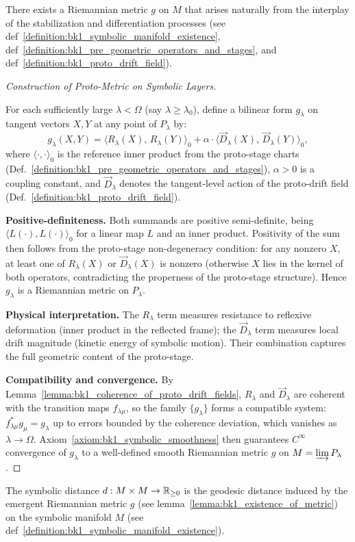 \begin{lemma}
\label{lemma:bk1_existence_of_metric}
There exists a Riemannian metric $g$ on $M$ that arises naturally from the interplay of the stabilization and differentiation processes (see def~\ref{definition:bk1_symbolic_manifold_existence}, def~\ref{definition:bk1_pre_geometric_operators_and_stages}, and def~\ref{definition:bk1_proto_drift_field}).
\begin{proof}[Construction of Proto-Metric on Symbolic Layers]
\label{proof:bk1_sketch_construction_proto_metric}
\leavevmode

For each sufficiently large $\lambda < \Omega$ (say $\lambda \ge \lambda_0$), define a
bilinear form $g_\lambda$ on tangent vectors $X, Y$ at any point of $P_\lambda$ by:
\[
g_\lambda(X, Y)
= \bigl\langle R_\lambda(X),\, R_\lambda(Y) \bigr\rangle_0
+ \alpha \cdot \bigl\langle \vec{D}_\lambda(X),\, \vec{D}_\lambda(Y) \bigr\rangle_0,
\]
where $\langle\cdot,\cdot\rangle_0$ is the reference inner product from the proto-stage
charts (Def.~\ref{definition:bk1_pre_geometric_operators_and_stages}), $\alpha > 0$ is a
coupling constant, and $\vec{D}_\lambda$ denotes the tangent-level action of the
proto-drift field (Def.~\ref{definition:bk1_proto_drift_field}).

\textbf{Positive-definiteness.}
Both summands are positive semi-definite, being
$\langle L(\cdot), L(\cdot)\rangle_0$ for a linear map $L$ and an inner product. Positivity of the sum then follows from the proto-stage
non-degeneracy condition: for any nonzero $X$, at least one of $R_\lambda(X)$ or
$\vec{D}_\lambda(X)$ is nonzero (otherwise $X$ lies in the kernel of both operators,
contradicting the properness of the proto-stage structure).
Hence $g_\lambda$ is a Riemannian metric on $P_\lambda$.

\textbf{Physical interpretation.}
The $R_\lambda$ term measures resistance to reflexive deformation (inner product in the
reflected frame); the $\vec{D}_\lambda$ term measures local drift magnitude (kinetic
energy of symbolic motion). Their combination captures the full geometric content of the
proto-stage.

\textbf{Compatibility and convergence.}
By Lemma~\ref{lemma:bk1_coherence_of_proto_drift_fields}, $R_\lambda$ and $\vec{D}_\lambda$
are coherent with the transition maps $f_{\lambda\mu}$, so the family $\{g_\lambda\}$
forms a compatible system: $f_{\lambda\mu}^* g_\mu = g_\lambda$ up to errors bounded by
the coherence deviation, which vanishes as $\lambda \to \Omega$.
Axiom~\ref{axiom:bk1_symbolic_smoothness} then guarantees $C^\infty$ convergence
of $g_\lambda$ to a well-defined smooth Riemannian metric $g$ on
$M = \varinjlim P_\lambda$.
\end{proof}
\end{lemma}
\begin{definition}
\label{definition:bk1_symbolic_distance}
The symbolic distance $d: M \times M \to \mathbb{R}_{\geq 0}$ is the geodesic distance induced by the emergent Riemannian metric $g$ (see lemma~\ref{lemma:bk1_existence_of_metric}) on the symbolic manifold $M$ (see def~\ref{definition:bk1_symbolic_manifold_existence}).
\end{definition}

